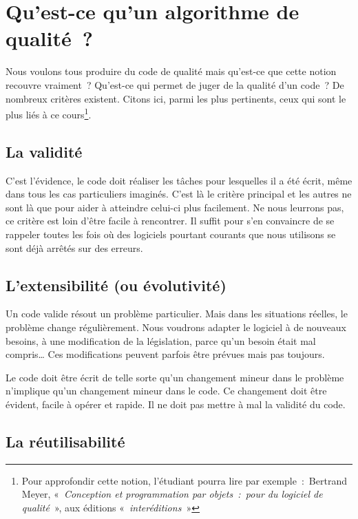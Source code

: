 \section{Qu’est-ce qu’un algorithme de qualité~?}

	{
	Nous voulons tous produire du code de qualité mais
	qu’est-ce que cette notion recouvre vraiment~?
	Qu’est-ce qui permet de juger de la qualité
	d’un code~? De nombreux critères existent. Citons ici,
	parmi les plus pertinents, ceux qui sont le plus liés à ce
	cours\footnote{Pour approfondir cette notion,
	l’étudiant pourra lire par exemple~:~Bertrand Meyer,
	«~\textit{Conception et programmation par objets~:~pour du logiciel de
	qualité}~», aux éditions «\textit{~interéditions~}»}.}

\subsection{La validité}

	{
	C’est l’évidence, le code doit
	réaliser les tâches pour lesquelles il a été écrit, même dans tous les
	cas particuliers imaginés. C’est là le critère
	principal et les autres ne sont là que pour aider à atteindre celui-ci
	plus facilement. Ne nous leurrons pas, ce critère est loin
	d’être facile à rencontrer. Il suffit pour
	s’en convaincre de se rappeler toutes les fois où des
	logiciels pourtant courants que nous utilisons se sont déjà arrêtés sur
	des erreurs.}

\subsection{L’extensibilité (ou évolutivité)}

	{
	Un code valide résout un problème particulier. Mais dans les situations
	réelles, le problème change régulièrement. Nous voudrons adapter le
	logiciel à de nouveaux besoins, à une modification de la législation,
    parce qu’un besoin était mal compris\dots{} Ces modifications peuvent
	parfois être prévues mais pas toujours.}

	{
	Le code doit être écrit de telle sorte qu’un changement
	mineur dans le problème n’implique
	qu’un changement mineur dans le code. Ce changement
	doit être évident, facile à opérer et rapide. Il ne doit pas mettre à
	mal la validité du code.}

\subsection{La réutilisabilité}

